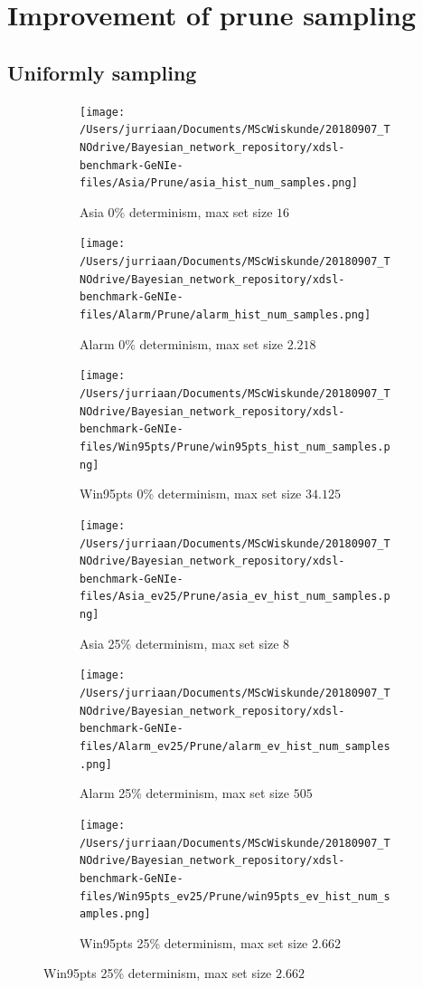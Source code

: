 \documentclass[a4paper, twoside, 11pt]{report}
\theoremstyle{plain}
\theoremstyle{definition}
\theoremstyle{remark}
\begin{document}
\chapter{Improvement of prune sampling}
\section{Uniformly sampling}
\begin{figure}[h!]
\centering
\captionsetup[subfigure]{justification=centering}

\begin{subfigure}{.3\linewidth}
\texttt{[image: /Users/jurriaan/Documents/MScWiskunde/20180907\_TNOdrive/Bayesian\_network\_repository/xdsl-benchmark-GeNIe-files/Asia/Prune/asia\_hist\_num\_samples.png]}
\caption{Asia 0\% determinism, max set size $16$}%
\label{asia_ev}%
\end{subfigure}\hfill%
\begin{subfigure}{.3\linewidth}
\texttt{[image: /Users/jurriaan/Documents/MScWiskunde/20180907\_TNOdrive/Bayesian\_network\_repository/xdsl-benchmark-GeNIe-files/Alarm/Prune/alarm\_hist\_num\_samples.png]}
\caption{Alarm 0\% determinism, max set size $2.218$}%
\label{alarm_ev}%
\end{subfigure}\hfill%
\begin{subfigure}{.3\linewidth}
\texttt{[image: /Users/jurriaan/Documents/MScWiskunde/20180907\_TNOdrive/Bayesian\_network\_repository/xdsl-benchmark-GeNIe-files/Win95pts/Prune/win95pts\_hist\_num\_samples.png]}
\caption{Win95pts 0\% determinism, max set size $34.125$}%
\label{win95pts_ev}%
\end{subfigure}\hfill%

\begin{subfigure}{.3\linewidth}
\texttt{[image: /Users/jurriaan/Documents/MScWiskunde/20180907\_TNOdrive/Bayesian\_network\_repository/xdsl-benchmark-GeNIe-files/Asia\_ev25/Prune/asia\_ev\_hist\_num\_samples.png]}
\caption{Asia 25\% determinism, max set size $8$}%
\label{asia_ev}%
\end{subfigure}\hfill%
\begin{subfigure}{.3\linewidth}
\texttt{[image: /Users/jurriaan/Documents/MScWiskunde/20180907\_TNOdrive/Bayesian\_network\_repository/xdsl-benchmark-GeNIe-files/Alarm\_ev25/Prune/alarm\_ev\_hist\_num\_samples.png]}
\caption{Alarm 25\% determinism, max set size $505$}%
\label{alarm_ev}%
\end{subfigure}\hfill%
\begin{subfigure}{.3\linewidth}
\texttt{[image: /Users/jurriaan/Documents/MScWiskunde/20180907\_TNOdrive/Bayesian\_network\_repository/xdsl-benchmark-GeNIe-files/Win95pts\_ev25/Prune/win95pts\_ev\_hist\_num\_samples.png]}
\caption{Win95pts 25\% determinism, max set size $2.662$}%
\label{win95pts_ev}%
\end{subfigure}\hfill%


\end{figure}
\end{document}

